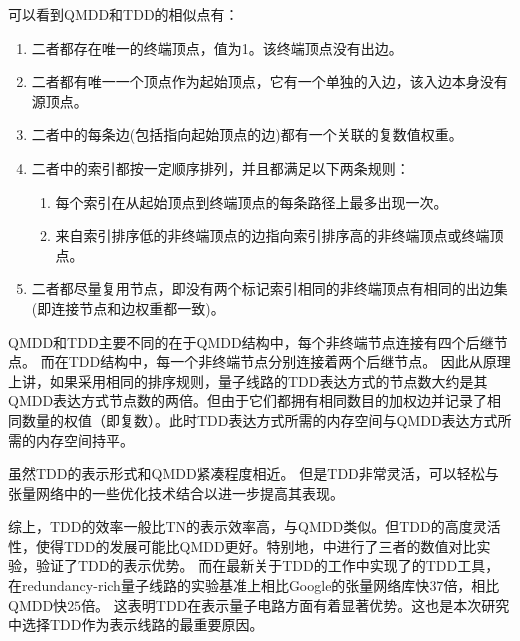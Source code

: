 可以看到QMDD和TDD的相似点有：
\begin{enumerate}
    \item 二者都存在唯一的终端顶点，值为1。该终端顶点没有出边。
    \item 二者都有唯一一个顶点作为起始顶点，它有一个单独的入边，该入边本身没有源顶点。
    \item 二者中的每条边(包括指向起始顶点的边)都有一个关联的复数值权重。
    \item 二者中的索引都按一定顺序排列，并且都满足以下两条规则：
    \begin{enumerate}[label=\roman*)]
        \item 每个索引在从起始顶点到终端顶点的每条路径上最多出现一次。
        \item 来自索引排序低的非终端顶点的边指向索引排序高的非终端顶点或终端顶点。
    \end{enumerate}
    \item 二者都尽量复用节点，即没有两个标记索引相同的非终端顶点有相同的出边集(即连接节点和边权重都一致)。
\end{enumerate}

QMDD和TDD主要不同的在于QMDD结构中，每个非终端节点连接有四个后继节点。
而在TDD结构中，每一个非终端节点分别连接着两个后继节点。
因此从原理上讲，如果采用相同的排序规则，量子线路的TDD表达方式的节点数大约是其QMDD表达方式节点数的两倍。但由于它们都拥有相同数目的加权边并记录了相同数量的权值（即复数）。此时TDD表达方式所需的内存空间与QMDD表达方式所需的内存空间持平。

虽然TDD的表示形式和QMDD紧凑程度相近。
但是TDD非常灵活，可以轻松与张量网络中的一些优化技术结合以进一步提高其表现。

综上，TDD的效率一般比TN的表示效率高，与QMDD类似。但TDD的高度灵活性，使得TDD的发展可能比QMDD更好。特别地，\cite{Hong_2022}中进行了三者的数值对比实验，验证了TDD的表示优势。
而在最新关于TDD的工作\citep{zhang2024quantum}中实现了的TDD工具，在redundancy-rich量子线路的实验基准上相比Google的张量网络库快$37$倍，相比QMDD快$25$倍。
这表明TDD在表示量子电路方面有着显著优势。这也是本次研究中选择TDD作为表示线路的最重要原因。

